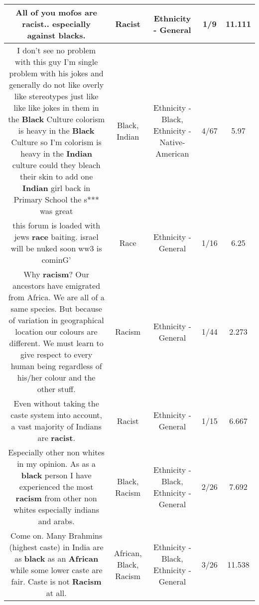 \documentclass[11pt]{article}
\newlength\mylength
\begin{document}
\begin{center}
\begin{longtable}{|C{.65\mylength}|C{.30\mylength}|C{.12\mylength}|C{.12\mylength}|C{.12\mylength}|}
  \small All of you mofos are \textbf{racist}.. especially against blacks.\normalsize   & Racist & Ethnicity - General & 1/9 & 11.111 \\  \hline
  \small I don't see no problem with this guy I'm single problem with his jokes and generally do not like overly like stereotypes just like like like jokes in them in the \textbf{Black} Culture colorism is heavy in the \textbf{Black} Culture so I'm colorism is heavy in the \textbf{Indian} culture could they bleach their skin to add one \textbf{Indian} girl back in Primary School the s*** was great\normalsize   & Black, Indian & Ethnicity - Black, Ethnicity - Native-American & 4/67 & 5.97 \\  \hline
  \small this forum is loaded with jews \textbf{race} baiting. israel will be nuked soon ww3 is cominG'\normalsize   & Race & Ethnicity - General & 1/16 & 6.25 \\  \hline
  \small Why \textbf{racism}? Our ancestors have emigrated from Africa. We are all of a same species. But because of variation in geographical location our colours are different. We must learn to give respect to every human being regardless of his/her colour and the other stuff.\normalsize   & Racism & Ethnicity - General & 1/44 & 2.273 \\  \hline
  \small Even without taking the caste system into account, a vast majority of Indians are \textbf{racist}.\normalsize   & Racist & Ethnicity - General & 1/15 & 6.667 \\  \hline
  \small Especially other non whites in my opinion. As as a \textbf{black} person I have experienced the most \textbf{racism} from other non whites especially indians and arabs.\normalsize   & Black, Racism & Ethnicity - Black, Ethnicity - General & 2/26 & 7.692 \\  \hline
  \small Come on. Many Brahmins (highest caste) in India are as \textbf{black} as an \textbf{African} while some lower caste are fair. Caste is not \textbf{Racism} at all.\normalsize   & African, Black, Racism & Ethnicity - Black, Ethnicity - General & 3/26 & 11.538 \\  \hline

\end{longtable}
\end{center}
\end{document}
